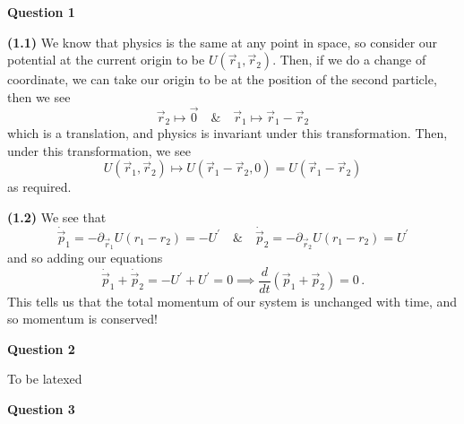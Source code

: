 \documentclass[10pt]{article}
\begin{document}
\textbf{Question 1}

\textbf{(1.1)} We know that physics is the same at any point in space, so consider our potential at the current origin to be $U(\vec{r}_{1},\vec{r}_{2})$. Then, if we do a change of coordinate, we can take our origin to be at the position of the second particle, then we see
\[ \vec{r}_{2} \mapsto \vec{0} \quad  \& \quad \vec{r}_{1} \mapsto \vec{r}_{1} -\vec{r}_{2} \]
which is a translation, and physics is invariant under this transformation. Then, under this transformation, we see
\[ U(\vec{r}_{1}, \vec{r}_{2}) \mapsto U(\vec{r}_{1} - \vec{r}_{2}, 0) =\boxed{U(\vec{r}_{1}-\vec{r}_{2})}\]
as required.

\textbf{(1.2)} We see that
\[ \dot{\vec{p}}_{1} = -\partial_{\vec{r}_{1}}U(r_{1} - r_{2}) = -U^{\prime} \quad \& \quad \dot{\vec{p}}_{2} = -\partial_{\vec{r}_{2}}U(r_{1} - r_{2}) = U^{\prime} \]
and so adding our equations
\[ \dot{\vec{p}}_{1} + \dot{\vec{p}}_{2} = -U^{\prime} + U^{\prime} = 0 \implies \boxed{\frac{d}{dt}\left(\vec{p}_{1} + \vec{p}_{2}\right) = 0} \, .\]
This tells us that the total momentum of our system is unchanged with time, and so momentum is conserved!

\textbf{Question 2}

To be latexed

\textbf{Question 3}

\end{document}
